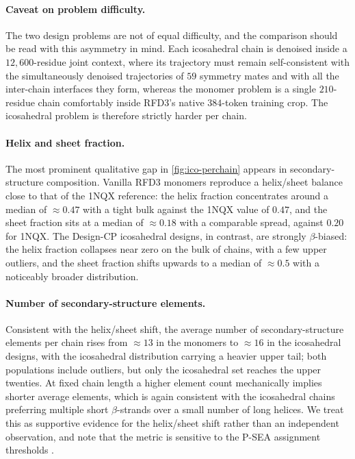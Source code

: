 \paragraph{Caveat on problem difficulty.}
The two design problems are not of equal difficulty, and the comparison should be
read with this asymmetry in mind. Each icosahedral chain is denoised inside a
$12{,}600$-residue joint context, where its trajectory must remain
self-consistent with the simultaneously denoised trajectories of $59$ symmetry
mates and with all the inter-chain interfaces they form, whereas the monomer
problem is a single $210$-residue chain comfortably inside RFD3's native
$384$-token training crop. The icosahedral problem is therefore strictly harder
per chain.

\paragraph{Helix and sheet fraction.}
The most prominent qualitative gap in \cref{fig:ico-perchain} appears in
secondary-structure composition. Vanilla RFD3 monomers reproduce a helix/sheet
balance close to that of the 1NQX reference: the helix fraction concentrates
around a median of $\approx 0.47$ with a tight bulk against the 1NQX value of
$0.47$, and the sheet fraction sits at a median of $\approx 0.18$ with a
comparable spread, against $0.20$ for 1NQX. The Design-CP icosahedral designs, in
contrast, are strongly $\beta$-biased: the helix fraction collapses near zero on
the bulk of chains, with a few upper outliers, and the sheet fraction shifts
upwards to a median of $\approx 0.5$ with a noticeably broader distribution.

\paragraph{Number of secondary-structure elements.}
Consistent with the helix/sheet shift, the average number of secondary-structure
elements per chain rises from $\approx 13$ in the monomers to $\approx 16$ in the
icosahedral designs, with the icosahedral distribution carrying a heavier upper
tail; both populations include outliers, but only the icosahedral set reaches the
upper twenties. At fixed chain length a higher element count mechanically implies
shorter average elements, which is again consistent with the icosahedral chains
preferring multiple short $\beta$-strands over a small number of long helices. We
treat this as supportive evidence for the helix/sheet shift rather than an
independent observation, and note that the metric is sensitive to the P-SEA
assignment thresholds \parencite{labesse_p-sea_1997}.

